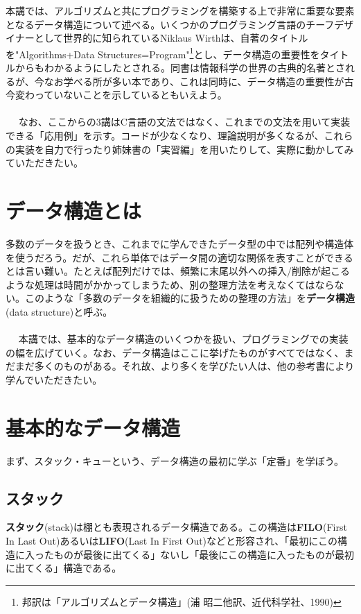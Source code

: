 本講では、アルゴリズムと共にプログラミングを構築する上で非常に重要な要素となるデータ構造について述べる。いくつかのプログラミング言語のチーフデザイナーとして世界的に知られているNiklaus Wirthは、自著のタイトルを"Algorithms+Data Structures=Program"\footnote{邦訳は「アルゴリズムとデータ構造」(浦 昭二他訳、近代科学社、1990)}とし、データ構造の重要性をタイトルからもわかるようにしたとされる。同書は情報科学の世界の古典的名著とされるが、今なお学べる所が多い本であり、これは同時に、データ構造の重要性が古今変わっていないことを示しているともいえよう。
\\ \\　
なお、ここからの3講はC言語の文法ではなく、これまでの文法を用いて実装できる「応用例」を示す。コードが少なくなり、理論説明が多くなるが、これらの実装を自力で行ったり姉妹書の「実習編」を用いたりして、実際に動かしてみていただきたい。
\section{データ構造とは}
﻿多数のデータを扱うとき、これまでに学んできたデータ型の中では配列や構造体を使うだろう。だが、これら単体ではデータ間の適切な関係を表すことができるとは言い難い。たとえば配列だけでは、頻繁に末尾以外への挿入/削除が起こるような処理は時間がかかってしまうため、別の整理方法を考えなくてはならない。このような「多数のデータを組織的に扱うための整理の方法」を\textbf{データ構造}(data structure)と呼ぶ。
\\ \\　
本講では、基本的なデータ構造のいくつかを扱い、プログラミングでの実装の幅を広げていく。なお、データ構造はここに挙げたものがすべてではなく、まだまだ多くのものがある。それ故、より多くを学びたい人は、他の参考書により学んでいただきたい。

\section{基本的なデータ構造}
まず、スタック・キューという、データ構造の最初に学ぶ「定番」を学ぼう。
\subsection{スタック}
\textbf{スタック}(stack)は棚とも表現されるデータ構造である。この構造は\textbf{FILO}(First In Last Out)あるいは\textbf{LIFO}(Last In First Out)などと形容され、「最初にこの構造に入ったものが最後に出てくる」ないし「最後にこの構造に入ったものが最初に出てくる」構造である。


